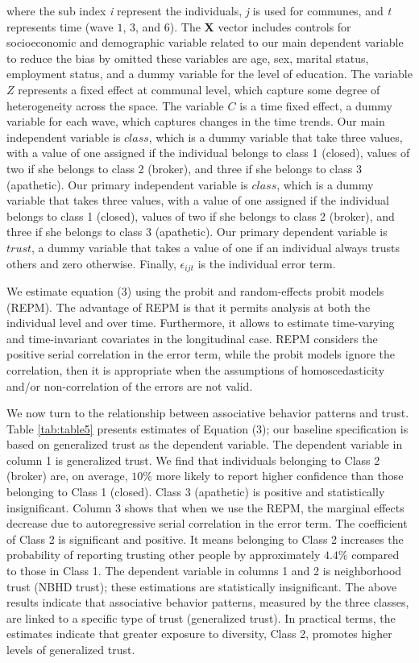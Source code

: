 where the sub index \textit{i} represent the individuals, \textit{j} is used for communes, and \textit{t} represents time (wave $1$, $3$, and $6$). The \textbf{X} vector includes controls for socioeconomic and demographic variable related to our main dependent variable to reduce the bias by omitted these variables are age, sex, marital status, employment status, and a dummy variable for the level of education. The variable $Z$ represents a fixed effect at communal level, which capture some degree of heterogeneity across the space. The variable $C$ is a time fixed effect, a dummy variable for each wave, which captures changes in the time trends. Our main independent variable is $class$, which is a dummy variable that take three values, with a value of one assigned if the individual belongs to class 1 (closed), values of two if she belongs to class 2 (broker), and three if she belongs to class 3 (apathetic). Our primary independent variable is $class$, which is a dummy variable that takes three values, with a value of one assigned if the individual belongs to class 1 (closed), values of two if she belongs to class 2 (broker), and three if she belongs to class 3 (apathetic). Our primary dependent variable is $trust$, a dummy variable that takes a value of one if an individual always trusts others and zero otherwise. Finally, $\epsilon_{ijt}$ is the individual error term. 
\bigskip

We estimate equation (3) using the probit and random-effects probit models (REPM). The advantage of REPM is that it permits analysis at both the individual level and over time. Furthermore, it allows to estimate time-varying and time-invariant covariates in the longitudinal case. REPM considers the positive serial correlation in the error term, while the probit models ignore the correlation, then it is appropriate when the assumptions of homoscedasticity and/or non-correlation of the errors are not valid.
\bigskip

We now turn to the relationship between associative behavior patterns and trust. Table \ref{tab:table5} presents estimates of Equation (3); our baseline specification is based on generalized trust as the dependent variable. The dependent variable in column 1 is generalized trust. We find that individuals belonging to Class 2 (broker) are, on average, $10\%$ more likely to report higher confidence than those belonging to Class 1 (closed). Class 3 (apathetic) is positive and statistically insignificant. Column 3 shows that when we use the REPM, the marginal effects decrease due to autoregressive serial correlation in the error term. The coefficient of Class 2 is significant and positive. It means belonging to Class 2 increases the probability of reporting trusting other people by approximately $4.4\%$ compared to those in Class 1. The dependent variable in columns 1 and 2 is neighborhood trust (NBHD trust); these estimations are statistically insignificant. The above results indicate that associative behavior patterns, measured by the three classes, are linked to a specific type of trust (generalized trust). In practical terms, the estimates indicate that greater exposure to diversity, Class 2, promotes higher levels of generalized trust.


